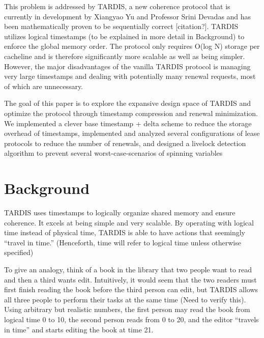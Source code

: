 \documentclass[12pt]{article}
\begin{document}
This problem is addressed by TARDIS, a new coherence protocol that is currently in development by Xiangyao Yu and Professor Srini Devadas and has been mathematically proven to be sequentially correct [citation?]. TARDIS utilizes logical timestamps (to be explained in more detail in Background) to enforce the global memory order. The protocol only requires O(log N) storage per cacheline and is therefore significantly more scalable as well as being simpler. However, the major disadvantages of the vanilla TARDIS protocol is managing very large timestamps and dealing with potentially many renewal requests, most of which are unnecessary. 

The goal of this paper is to explore the expansive design space of TARDIS and optimize the protocol through timestamp compression and renewal minimization. We implemented a clever base timestamp + delta scheme to reduce the storage overhead of timestamps, implemented and analyzed several configurations of lease protocols to reduce the number of renewals, and designed a livelock detection algorithm to prevent several worst-case-scenarios of spinning variables

\section{Background}
TARDIS uses timestamps to logically organize shared memory and ensure coherence. It excels at being simple and very scalable. By operating with logical time instead of physical time, TARDIS is able to have actions that seemingly “travel in time.” (Henceforth, time will refer to logical time unless otherwise specified)

To give an analogy, think of a book in the library that two people want to read and then a third wants edit. Intuitively, it would seem that the two readers must first finish reading the book before the third person can edit, but TARDIS allows all three people to perform their tasks at the same time (Need to verify this).  Using arbitrary but realistic numbers, the first person may read the book from logical time 0 to 10, the second person reads from 0 to 20, and the editor “travels in time” and starts editing the book at time 21.
\end{document}
